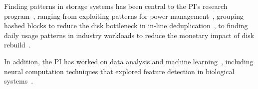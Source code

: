 Finding patterns in storage systems has been central to the PI's research program~\cite{avani-systor,TK_tos}, ranging from exploiting patterns for power management~\cite{avanipdsw}, grouping hashed blocks to reduce the disk bottleneck in in-line deduplication~\cite{hands}, to finding daily usage patterns in industry workloads to reduce the monetary impact of disk rebuild~\cite{perses}.   

%
In addition, the PI has worked on data analysis and machine learning~\cite{GAUL,TK_Env,TK_?,TK_tos,TK_thesis}, including neural computation techniques that explored feature detection in biological systems~\cite{TK_Tanya}.  




